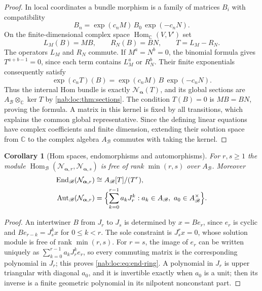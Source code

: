 \documentclass[11pt,letterpaper]{article}
\newtheorem{corollary}[corollary]{Corollary}
\theoremstyle{definition}
\theoremstyle{remark}
\newcommand{\C}{\mathbb C}
\newcommand{\BB}{\mathscr B}
\newcommand{\Aglob}{A_{\BB}}
\newcommand{\Hom}{\operatorname{Hom}}
\newcommand{\End}{\operatorname{End}}
\newcommand{\Aut}{\operatorname{Aut}}
\newcommand{\profile}{\boldsymbol\alpha}
\newcommand{\NN}[1]{\mathcal N_{\profile,#1}}
\numberwithin{equation}{section}
\begin{document}
\begin{proof}
In local coordinates a bundle morphism is a family of matrices $B_i$ with
compatibility
\begin{equation}\label{nab:loc:eq:hom-transition}
 B_n=\exp(c_nM)\,B_0\,\exp(-c_nN).
\end{equation}
On the finite-dimensional complex space $\Hom_\C(V,V')$ set
\[
 L_M(B)=MB,\qquad R_N(B)=BN,\qquad T=L_M-R_N.
\]
The operators $L_M$ and $R_N$ commute. If $M^a=N^b=0$, the binomial formula
gives $T^{a+b-1}=0$, since each term contains $L_M^a$ or $R_N^b$. Their finite
exponentials consequently satisfy
\[
 \exp(c_nT)(B)=\exp(c_nM)\,B\,\exp(-c_nN).
\]
Thus the internal Hom bundle is exactly $\mathcal N_{\profile}(T)$, and its
global sections are $\Aglob\otimes_\C\ker T$ by \cref{nab:loc:thm:sections}.
The condition $T(B)=0$ is $MB=BN$, proving the formula. A matrix in this kernel
is fixed by all transitions, which explains the common global representative.
Since the defining linear equations have complex coefficients and finite
dimension, extending their solution space from $\C$ to the complex algebra
$\Aglob$ commutes with taking the kernel.
\end{proof}

\begin{corollary}[Hom spaces, endomorphisms and automorphisms]
\label{nab:loc:cor:endomorphisms}
For $r,s\geq1$ the module $\Hom_{\BB}(\NN r,\NN s)$ is free of rank $\min(r,s)$
over $\Aglob$. Moreover
\begin{align}
 \End_{\BB}(\NN r)&\cong\Aglob[T]/(T^r),\label{nab:loc:eq:end-ring}\\
 \Aut_{\BB}(\NN r)&=
 \Bigl\{\sum_{k=0}^{r-1}a_kJ_r^k:a_k\in\Aglob,\ a_0\in\Aglob^\times\Bigr\}.
 \label{nab:loc:eq:aut-group}
\end{align}
\end{corollary}

\begin{proof}
An intertwiner $B$ from $J_r$ to $J_s$ is determined by $x=Be_r$, since $e_r$
is cyclic and $Be_{r-k}=J_s^kx$ for $0\leq k<r$. The sole constraint is
$J_s^rx=0$, whose solution module is free of rank $\min(r,s)$. For $r=s$, the
image of $e_r$ can be written uniquely as $\sum_{k=0}^{r-1}a_kJ_r^ke_r$, so
every commuting matrix is the corresponding polynomial in $J_r$; this proves
\eqref{nab:loc:eq:end-ring}. A polynomial in $J_r$ is upper triangular with
diagonal $a_0$, and it is invertible exactly when $a_0$ is a unit; then its
inverse is a finite geometric polynomial in its nilpotent nonconstant part.
\end{proof}
\end{document}
